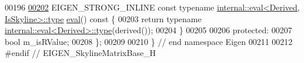 \begin{DoxyCode}
00196 
\hyperlink{class_eigen_1_1_skyline_matrix_base_a03d2346d1bc95c63405e03b6a39d2f7e}{00202}     EIGEN\_STRONG\_INLINE \textcolor{keyword}{const} \textcolor{keyword}{typename} \hyperlink{struct_eigen_1_1internal_1_1eval}{internal::eval<Derived, IsSkyline>::type}
       \hyperlink{class_eigen_1_1_skyline_matrix_base_a03d2346d1bc95c63405e03b6a39d2f7e}{eval}()\textcolor{keyword}{ const }\{
00203         \textcolor{keywordflow}{return} \textcolor{keyword}{typename} \hyperlink{struct_eigen_1_1internal_1_1eval}{internal::eval<Derived>::type}(derived());
00204     \}
00205 
00206 \textcolor{keyword}{protected}:
00207     \textcolor{keywordtype}{bool} m\_isRValue;
00208 \};
00209 
00210 \} \textcolor{comment}{// end namespace Eigen}
00211 
00212 \textcolor{preprocessor}{#endif // EIGEN\_SkylineMatrixBase\_H}
\end{DoxyCode}
